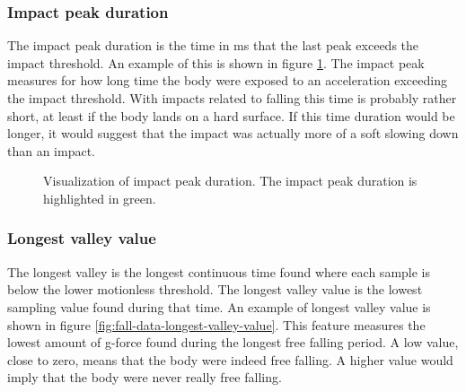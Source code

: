 \documentclass[12pt, a4paper, onecolumn]{article}
\begin{document}
	\subsubsection{Impact peak duration}
	
	The impact peak duration is the time in ms that the last peak exceeds the impact threshold. An example of this is shown in figure \ref{fig:fall-data-impact-peak-duration}. The impact peak measures for how long time the body were exposed to an acceleration exceeding the impact threshold. With impacts related to falling this time is probably rather short, at least if the body lands on a hard surface. If this time duration would be longer, it would suggest that the impact was actually more of a soft slowing down than an impact.
	
	\begin{figure}[H]
		\centering
		\caption{Visualization of impact peak duration. The impact peak duration is highlighted in green.}%
		\label{fig:fall-data-impact-peak-duration}%
	\end{figure}
	
	\subsubsection{Longest valley value}
	
	The longest valley is the longest continuous time found where each sample is below the lower motionless threshold. The longest valley value is the lowest sampling value found during that time. An example of longest valley value is shown in figure \ref{fig:fall-data-longest-valley-value}. This feature measures the lowest amount of g-force found during the longest free falling period. A low value, close to zero, means that the body were indeed free falling. A higher value would imply that the body were never really free falling.
	
\end{document}
